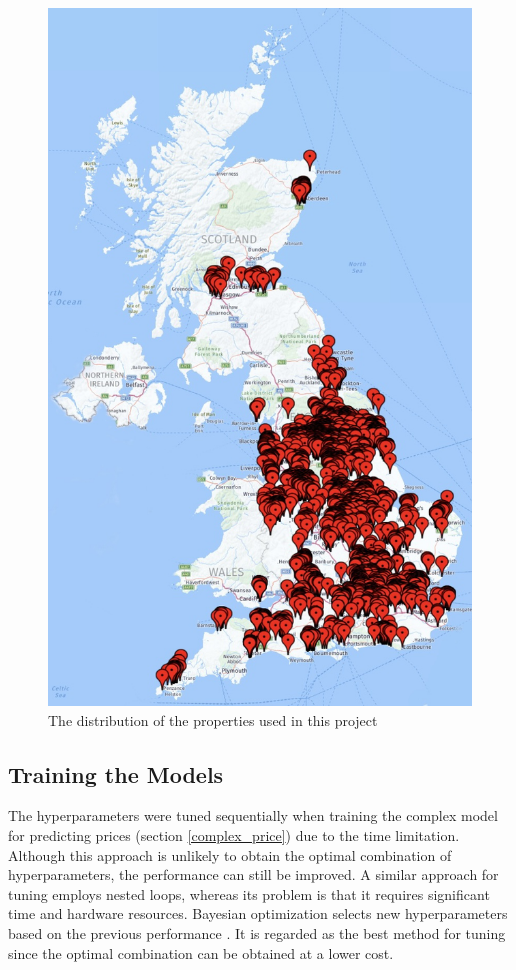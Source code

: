 \documentclass[12pt,twoside]{report}
\begin{document}
\begin{figure}[H]
	\centering
	\includegraphics[width=13cm]{uk_distribution}
	\caption{The distribution of the properties used in this project}
	\label{uk_distribution}
\end{figure}

\subsection{Training the Models}
The hyperparameters were tuned sequentially when training the complex model for predicting prices (section \ref{complex_price}) due to the time limitation. Although this approach is unlikely to obtain the optimal combination of hyperparameters, the performance can still be improved. A similar approach for tuning employs nested loops, whereas its problem is that it requires significant time and hardware resources. Bayesian optimization selects new hyperparameters based on the previous performance \citep{RN38}. It is regarded as the best method for tuning since the optimal combination can be obtained at a lower cost. 
\end{document}
